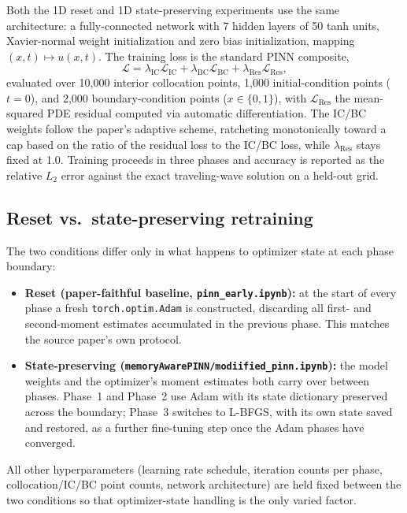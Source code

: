 \documentclass[11pt]{article}
\begin{document}
Both the 1D reset and 1D state-preserving experiments use the same architecture: a fully-connected
network with 7 hidden layers of 50 tanh units, Xavier-normal weight initialization and zero bias
initialization, mapping $(x,t) \mapsto u(x,t)$. The training loss is the standard PINN composite,
\begin{equation}
\mathcal{L} = \lambda_{\text{IC}} \mathcal{L}_{\text{IC}} + \lambda_{\text{BC}} \mathcal{L}_{\text{BC}}
+ \lambda_{\text{Res}} \mathcal{L}_{\text{Res}},
\end{equation}
evaluated over 10{,}000 interior collocation points, 1{,}000 initial-condition points ($t=0$), and
2{,}000 boundary-condition points ($x \in \{0,1\}$), with $\mathcal{L}_{\text{Res}}$ the mean-squared
PDE residual computed via automatic differentiation. The IC/BC weights follow the paper's adaptive
scheme, ratcheting monotonically toward a cap based on the ratio of the residual loss to the IC/BC
loss, while $\lambda_{\text{Res}}$ stays fixed at 1.0. Training proceeds in three phases and accuracy is
reported as the relative $L_2$ error against the exact traveling-wave solution on a held-out grid.

\subsection{Reset vs.\ state-preserving retraining}

The two conditions differ only in what happens to optimizer state at each phase boundary:

\begin{itemize}
\item \textbf{Reset (paper-faithful baseline, \texttt{pinn\_early.ipynb}):} at the start of every phase
a fresh \texttt{torch.optim.Adam} is constructed, discarding all first- and second-moment estimates
accumulated in the previous phase. This matches the source paper's own protocol.
\item \textbf{State-preserving (\texttt{memoryAwarePINN/modiified\_pinn.ipynb}):} the model weights and
the optimizer's moment estimates both carry over between phases. Phase~1 and Phase~2 use Adam with its
state dictionary preserved across the boundary; Phase~3 switches to L-BFGS, with its own state saved
and restored, as a further fine-tuning step once the Adam phases have converged.
\end{itemize}

All other hyperparameters (learning rate schedule, iteration counts per phase, collocation/IC/BC point
counts, network architecture) are held fixed between the two conditions so that optimizer-state handling
is the only varied factor.
\end{document}
